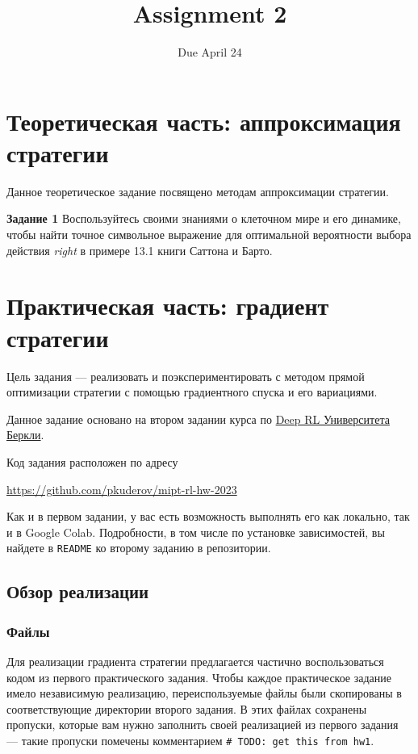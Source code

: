 \documentclass[12pt, oneside]{article}
\author{Due April 24}
\title{Assignment 2}
\date{}
\begin{document}
\maketitle
\thispagestyle{fancy}

\section{Теоретическая часть: аппроксимация стратегии}

Данное теоретическое задание посвящено методам аппроксимации стратегии.

\textbf{Задание 1} Воспользуйтесь своими знаниями о клеточном мире и его динамике, чтобы найти точное символьное выражение для оптимальной вероятности выбора действия \textit{right} в примере 13.1 книги Саттона и Барто.

\section{Практическая часть: градиент стратегии}

Цель задания --- реализовать и поэкспериментировать с методом прямой оптимизации стратегии с помощью градиентного спуска и его вариациями.

Данное задание основано на втором задании курса по \href{http://rail.eecs.berkeley.edu/deeprlcourse/}{Deep RL Университета Беркли}.

Код задания расположен по адресу
\begin{center}
    \href{https://github.com/pkuderov/mipt-rl-hw-2023}{https://github.com/pkuderov/mipt-rl-hw-2023}
\end{center}

Как и в первом задании, у вас есть возможность выполнять его как локально, так и в Google Colab. Подробности, в том числе по установке зависимостей, вы найдете в \verb|README| ко второму заданию в репозитории.

\subsection{Обзор реализации}

\subsubsection{Файлы}

Для реализации градиента стратегии предлагается частично воспользоваться кодом из первого практического задания. Чтобы каждое практическое задание имело независимую реализацию, переиспользуемые файлы были скопированы в соответствующие директории второго задания. В этих файлах сохранены пропуски, которые вам нужно заполнить своей реализацией из первого задания --- такие пропуски помечены комментарием \verb|# TODO: get this from hw1|.
\end{document}
